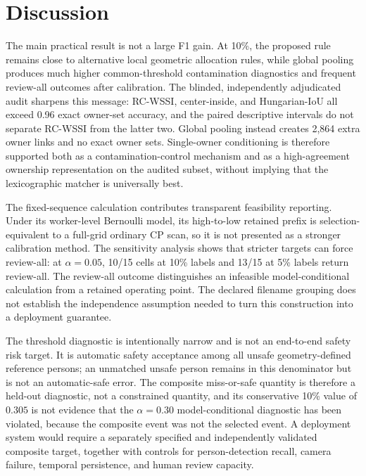 \documentclass[iicol,pdflatex,sn-mathphys-num]{sn-jnl}
\begin{document}
\section{Discussion}\label{sec:discussion}

The main practical result is not a large F1 gain. At 10\%, the proposed rule remains close to alternative local geometric allocation rules, while global pooling produces much higher common-threshold contamination diagnostics and frequent review-all outcomes after calibration. The blinded, independently adjudicated audit sharpens this message: RC-WSSI, center-inside, and Hungarian-IoU all exceed 0.96 exact owner-set accuracy, and the paired descriptive intervals do not separate RC-WSSI from the latter two. Global pooling instead creates 2,864 extra owner links and no exact owner sets. Single-owner conditioning is therefore supported both as a contamination-control mechanism and as a high-agreement ownership representation on the audited subset, without implying that the lexicographic matcher is universally best.

The fixed-sequence calculation contributes transparent feasibility reporting. Under its worker-level Bernoulli model, its high-to-low retained prefix is selection-equivalent to a full-grid ordinary CP scan, so it is not presented as a stronger calibration method. The sensitivity analysis shows that stricter targets can force review-all: at $\alpha=0.05$, 10/15 cells at 10\% labels and 13/15 at 5\% labels return review-all. The review-all outcome distinguishes an infeasible model-conditional calculation from a retained operating point. The declared filename grouping does not establish the independence assumption needed to turn this construction into a deployment guarantee.

The threshold diagnostic is intentionally narrow and is not an end-to-end safety risk target. It is automatic safety acceptance among all unsafe geometry-defined reference persons; an unmatched unsafe person remains in this denominator but is not an automatic-safe error. The composite miss-or-safe quantity is therefore a held-out diagnostic, not a constrained quantity, and its conservative 10\% value of $0.305$ is not evidence that the $\alpha=0.30$ model-conditional diagnostic has been violated, because the composite event was not the selected event. A deployment system would require a separately specified and independently validated composite target, together with controls for person-detection recall, camera failure, temporal persistence, and human review capacity.
\end{document}

